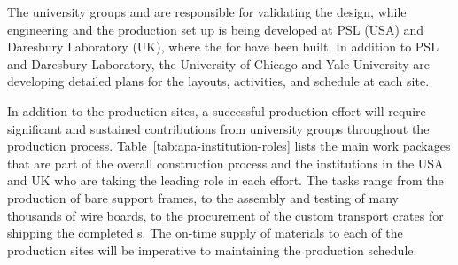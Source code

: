 



The university groups and  are responsible for validating  the design, while engineering and the production set up is being developed at PSL %
(USA) and Daresbury Laboratory (UK), where the  for  have been built. 
In addition to PSL and Daresbury Laboratory, the University of Chicago and Yale University are developing detailed plans for the layouts, activities, and schedule at each site. 

In addition to the  production sites, a successful production effort will require significant and sustained contributions from university groups throughout the production process.  Table~\ref{tab:apa-institution-roles} lists the main work packages that are part of the overall  construction process and the institutions in the USA and UK who are taking the leading role in each effort.  The tasks range from the production of bare support frames, to the assembly and testing of many thousands of wire boards, to the procurement of the custom transport crates for shipping the completed s.  The on-time supply of materials to each of the  production sites will be imperative to maintaining the production schedule.  

